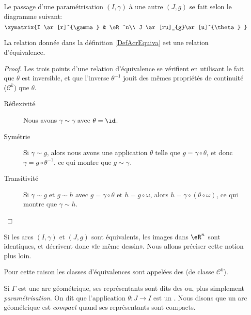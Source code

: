 Le passage d'une paramétrisation $(I,\gamma)$ à une autre $(J,g)$ se fait selon le diagramme suivant:
\begin{equation}
\xymatrix{%
I \ar[r]^{\gamma}   &   \eR^n\\
J \ar[ru]_{g}\ar[u]^{\theta}    
   }
\end{equation}

\begin{proposition}
La relation donnée dans la définition \ref{DefAcrEquiva} est une relation d'équivalence.
\end{proposition}

\begin{proof}
Les trois points d'une relation d'équivalence se vérifient en utilisant le fait que $\theta$ est inversible, et que l'inverse $\theta^{-1}$ jouit des mêmes propriétés de continuité ($\mathcal{C}^k$) que $\theta$. 
\begin{description}
    \item[Réflexivité] Nous avons $\gamma\sim \gamma$ avec $\theta=\id$.
    \item[Symétrie] Si $\gamma\sim g$, alors nous avons une application $\theta$ telle que $g=\gamma\circ\theta$, et donc $\gamma=g\circ\theta^{-1}$, ce qui montre que $g\sim \gamma$.
    \item[Transitivité] Si $\gamma\sim g$ et $g\sim h$ avec $g=\gamma\circ\theta$ et $h=g\circ\omega$, alors $h=\gamma\circ(\theta\circ\omega)$, ce qui montre que $\gamma\sim h$.
\end{description}
\end{proof}
Si les arcs $(I,\gamma)$ et $(J,g)$ sont équivalents, les images dans $\eR^n$ sont identiques, et décrivent donc «le même dessin». Nous allons préciser cette notion plus loin. 

\begin{definition}
    Pour cette raison les classes d'équivalences sont appelées des  (de classe $\mathcal{C}^k$).
\end{definition}

Si $\Gamma$ est une arc géométrique, ses représentants sont dits des  ou, plus simplement \emph{paramétrisation}. On dit que l'application $\theta\colon J\to I$ est un . Nous disons que un arc géométrique est \emph{compact} quand ses représentants sont compacts.


